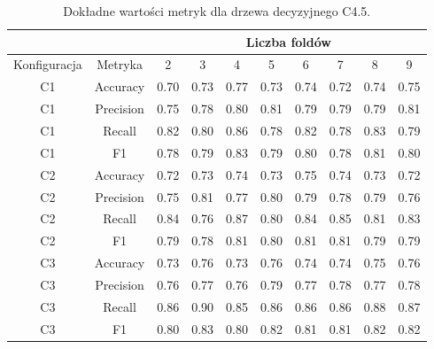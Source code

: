 \begin{table}[H]
  \center
\begin{tabular}{|c|c|c|c|c|c|c|c|c|c|}  \hline
  \multicolumn{2}{|c|}{} & \multicolumn{8}{c|}{Liczba foldów} \\ \hline
Konfiguracja &    Metryka &     2 &     3 &     4 &     5 &     6 &     7 &     8 &     9 \\ \hline
          C1 &   Accuracy &  0.70 &  0.73 &  0.77 &  0.73 &  0.74 &  0.72 &  0.74 &  0.75 \\ \hline
          C1 &  Precision &  0.75 &  0.78 &  0.80 &  0.81 &  0.79 &  0.79 &  0.79 &  0.81 \\ \hline
          C1 &     Recall &  0.82 &  0.80 &  0.86 &  0.78 &  0.82 &  0.78 &  0.83 &  0.79 \\ \hline
          C1 &         F1 &  0.78 &  0.79 &  0.83 &  0.79 &  0.80 &  0.78 &  0.81 &  0.80 \\ \hline \hline
          C2 &   Accuracy &  0.72 &  0.73 &  0.74 &  0.73 &  0.75 &  0.74 &  0.73 &  0.72 \\ \hline
          C2 &  Precision &  0.75 &  0.81 &  0.77 &  0.80 &  0.79 &  0.78 &  0.79 &  0.76 \\ \hline
          C2 &     Recall &  0.84 &  0.76 &  0.87 &  0.80 &  0.84 &  0.85 &  0.81 &  0.83 \\ \hline
          C2 &         F1 &  0.79 &  0.78 &  0.81 &  0.80 &  0.81 &  0.81 &  0.79 &  0.79 \\ \hline \hline
          C3 &   Accuracy &  0.73 &  0.76 &  0.73 &  0.76 &  0.74 &  0.74 &  0.75 &  0.76 \\ \hline
          C3 &  Precision &  0.76 &  0.77 &  0.76 &  0.79 &  0.77 &  0.78 &  0.77 &  0.78 \\ \hline
          C3 &     Recall &  0.86 &  0.90 &  0.85 &  0.86 &  0.86 &  0.86 &  0.88 &  0.87 \\ \hline
          C3 &         F1 &  0.80 &  0.83 &  0.80 &  0.82 &  0.81 &  0.81 &  0.82 &  0.82 \\ \hline
\end{tabular}
  \caption{Dokładne wartości metryk dla drzewa decyzyjnego C4.5.}
\end{table}

